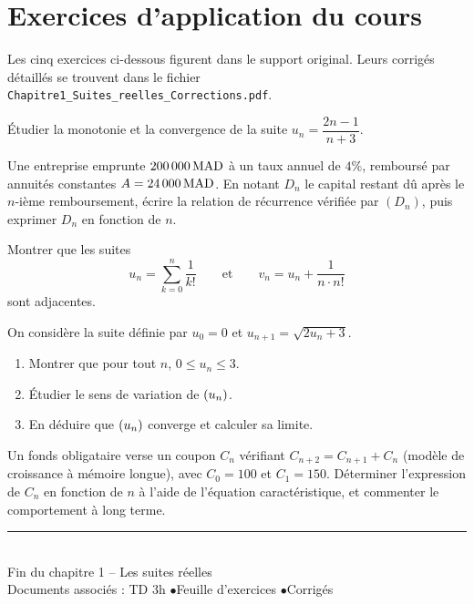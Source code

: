 \documentclass[12pt,a4paper]{article}
\begin{document}
\section{Exercices d'application du cours}

Les cinq exercices ci-dessous figurent dans le support original. Leurs corrigés détaillés se trouvent dans le fichier \texttt{Chapitre1\_Suites\_reelles\_Corrections.pdf}.

\begin{exobox}
Étudier la monotonie et la convergence de la suite $u_n = \dfrac{2n-1}{n+3}$.
\end{exobox}

\begin{exobox}
Une entreprise emprunte $200\,000\,\mathrm{MAD}$ à un taux annuel de $4\%$, remboursé par annuités constantes $A = 24\,000\,\mathrm{MAD}$. En notant $D_n$ le capital restant dû après le $n$-ième remboursement, écrire la relation de récurrence vérifiée par $(D_n)$, puis exprimer $D_n$ en fonction de $n$.
\end{exobox}

\begin{exobox}
Montrer que les suites
\[
u_n = \sum_{k=0}^{n} \dfrac{1}{k!}
\qquad\text{et}\qquad
v_n = u_n + \dfrac{1}{n\cdot n!}
\]
sont adjacentes.
\end{exobox}

\begin{exobox}
On considère la suite définie par $u_0=0$ et $u_{n+1}=\sqrt{2u_n+3}$.
\begin{enumerate}
  \item Montrer que pour tout $n$, $0\leq u_n \leq 3$.
  \item Étudier le sens de variation de $(u_n)$.
  \item En déduire que $(u_n)$ converge et calculer sa limite.
\end{enumerate}
\end{exobox}

\begin{exobox}
Un fonds obligataire verse un coupon $C_n$ vérifiant $C_{n+2}=C_{n+1}+C_n$ (modèle de croissance à mémoire longue), avec $C_0=100$ et $C_1=150$. Déterminer l'expression de $C_n$ en fonction de $n$ à l'aide de l'équation caractéristique, et commenter le comportement à long terme.
\end{exobox}

\vspace{0.8cm}
\begin{center}
{\color{mundigray}\rule{0.4\textwidth}{0.4pt}}\\[0.3cm]
{\small\color{mundigray} Fin du chapitre 1 -- Les suites réelles}\\
{\small\color{mundigray} Documents associés : TD 3h \quad$\bullet$\quad Feuille d'exercices \quad$\bullet$\quad Corrigés}
\end{center}
\end{document}
